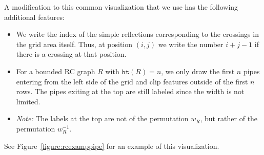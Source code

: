 \documentclass{amsart}
\theoremstyle{definition}
\theoremstyle{remark}
\numberwithin{equation}{subsection}
\newcommand{\wof}[1]{w_{#1}}
\newcommand{\hr}{\mathtt{ht}}
\begin{document}
A modification to this common visualization that we use has the following additional features:
\begin{itemize}
\item We write the index of the simple reflections corresponding to the crossings in the grid area itself. Thus, at position $(i,j)$ we write the number $i+j-1$ if there is a crossing at that position.
\item For a bounded RC graph $R$ with $\hr(R)=n$, we only draw the first $n$ pipes entering from the left side of the grid and clip features outside of the first $n$ rows. The pipes exiting at the top are still labeled since the width is not limited.
\item \emph{Note:} The labels at the top are not of the permutation $\wof{R}$, but rather of the permutation $\wof{R}^{-1}$.
\end{itemize}

See Figure~\ref{figure:rcexamppipe} for an example of this visualization.	
\end{document}
